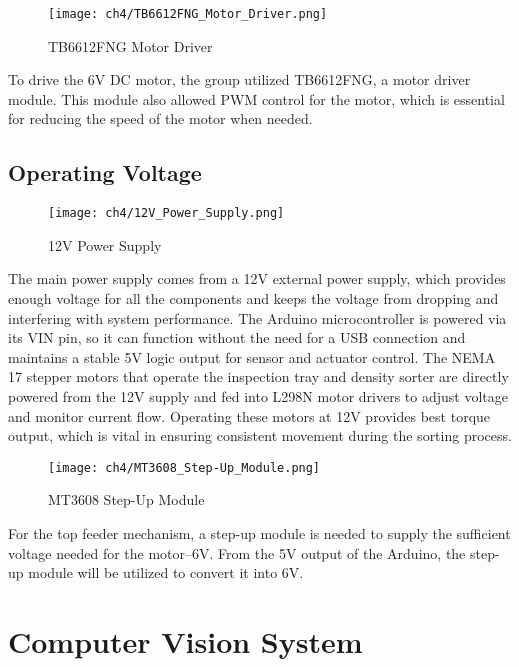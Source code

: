 \begin{figure}[H]
    \centering
    \texttt{[image: ch4/TB6612FNG\_Motor\_Driver.png]} %
    \caption{TB6612FNG Motor Driver}
    \label{fig:motor_driver}
\end{figure}

To drive the 6V DC motor, the group utilized TB6612FNG, a motor driver module. This module also allowed PWM control for the motor, which is essential for reducing the speed of the motor when needed. 

\subsection{Operating Voltage}

\begin{figure}[H]
    \centering
    \texttt{[image: ch4/12V\_Power\_Supply.png]} %
    \caption{12V Power Supply}
    \label{fig:12v_power_supply}
\end{figure}

The main power supply comes from a 12V external power supply, which provides enough voltage for all the components and keeps the voltage from dropping and interfering with system performance. The Arduino microcontroller is powered via its VIN pin, so it can function without the need for a USB connection and maintains a stable 5V logic output for sensor and actuator control. The NEMA 17 stepper motors that operate the inspection tray and density sorter are directly powered from the 12V supply and fed into L298N motor drivers to adjust voltage and monitor current flow. Operating these motors at 12V provides best torque output, which is vital in ensuring consistent movement during the sorting process.

\begin{figure}[H]
    \centering
    \texttt{[image: ch4/MT3608\_Step-Up\_Module.png]} %
    \caption{MT3608 Step-Up Module}
    \label{fig:mt3608}
\end{figure}

For the top feeder mechanism, a step-up module is needed to supply the sufficient voltage needed for the motor–6V. From the 5V output of the Arduino, the step-up module will be utilized to convert it into 6V.

\section{Computer Vision System}
